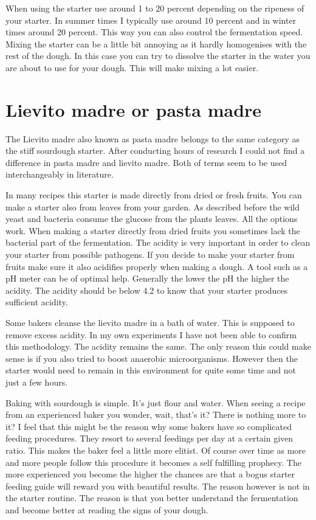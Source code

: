 When using the starter use around 1 to 20 percent depending on the ripeness of
your starter. In summer times I typically use around 10 percent and in winter
times around 20 percent. This way you can also control the fermentation speed.
Mixing the starter can be a little bit annoying as it hardly homogenises with
the rest of the dough. In this case you can try to dissolve the starter in the
water you are about to use for your dough. This will make mixing a lot easier.


\section{Lievito madre or pasta madre}

The Lievito madre also known as pasta madre belongs to the same category as
the stiff sourdough starter. After conducting hours of research I could not
find a difference in pasta madre and lievito madre. Both of terms seem to be
used interchangeably in literature.

In many recipes this starter is made directly
from dried or fresh fruits. You can make a starter also from leaves from your
garden. As described before the wild yeast and bacteria consume the glucose
from the plants leaves. All the options work. When making a starter directly
from dried fruits you sometimes lack the bacterial part of the fermentation.
The acidity is very important in order to clean your starter from possible
pathogens. If you decide to make your starter from fruits make sure it also
acidifies properly when making a dough. A tool such as a pH meter can be of
optimal help. Generally the lower the pH the higher the acidity. The acidity
should be below 4.2 to know that your starter produces sufficient acidity.

Some bakers cleanse the lievito madre in a bath of water. This is supposed to
remove excess acidity. In my own experiments I have not been able to confirm
this methodology. The acidity remains the same. The only reason this could
make sense is if you also tried to boost anaerobic microorganisms. However then the
starter would need to remain in this environment for quite some time and not just
a few hours.

Baking with sourdough is simple. It's just flour and water. When seeing a recipe
from an experienced baker you wonder, wait, that's it? There is nothing more
to it? I feel that this might be the reason why some bakers have so complicated
feeding procedures. They resort to several feedings per day at a certain given ratio.
This makes the baker feel a little more elitist. Of course over time as
more and more people follow this procedure it becomes a self fulfilling prophecy.
The more experienced you become the higher the chances are that a bogus starter
feeding guide will reward you with beautiful results. The reason however is
not in the starter routine. The reason is that you better understand the fermentation
and become better at reading the signs of your dough.


